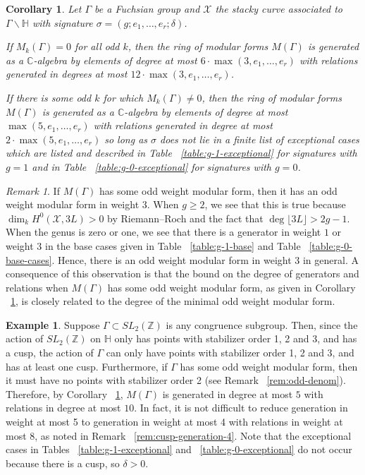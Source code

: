 \documentclass{amsart}
\theoremstyle{plain}
\newtheorem{cor}[thm]{Corollary}
\theoremstyle{definition}
\newtheorem{example}[thm]{Example}
\theoremstyle{remark}
\newtheorem{rem}[thm]{Remark}
\numberwithin{equation}{section}
\newcommand\BH{{\mathbb H}}
\newcommand\BC{{\mathbb C}}
\newcommand\BZ{{\mathbb Z}}
\newcommand\sx{\mathscr X}
\newcommand{\halfcan}{L}
\begin{document}
\begin{cor}
\label{cor:main-mod-forms}
Let $\Gamma$ be a Fuchsian group and $\sx$ the stacky curve
associated to $\Gamma \backslash \BH$ with signature $\sigma
= (g; e_1, \ldots, e_r; \delta)$. 

If $M_k(\Gamma) = 0$ for all odd $k$, then the ring of modular
forms $M(\Gamma)$ is generated as a $\BC$-algebra by elements of
degree at most $6 \cdot \max(3, e_1, \ldots, e_r)$ with relations
generated in degrees at most $12 \cdot \max(3, e_1, \ldots, e_r)$.

If there is some odd $k$ for which $M_k(\Gamma) \neq 0$, then the
ring of modular forms $M(\Gamma)$ is generated as a $\BC$-algebra
by elements of degree at most $\max(5, e_1, \ldots, e_r)$ with
relations generated in degree at most $2 \cdot \max(5, e_1, \ldots, 
e_r)$ so long as $\sigma$ does not lie in a finite list of
exceptional cases which are listed and described in Table
~\ref{table:g-1-exceptional} for signatures with $g = 1$ and in
Table ~\ref{table:g-0-exceptional} for signatures with $g = 0$.
\end{cor}

\begin{rem}
\label{rem:gen-at-most-three}
If $M(\Gamma)$ has some odd weight modular form, then it has an odd weight modular form in weight $3$. When $g \geq 2$, we see that this is true because $\dim_k H^0(\sx, 3\halfcan) > 0$ by Riemann--Roch and the fact that $\deg \lfloor 3\halfcan \rfloor > 2g - 1$. When the genus is zero or one, we see that there is a generator in weight $1$ or weight $3$ in the base cases given in Table ~\ref{table:g-1-base} and Table ~\ref{table:g-0-base-cases}. Hence, there is an odd weight modular form in weight $3$ in general. A consequence of this observation is that the bound on the degree of generators and relations when $M(\Gamma)$ has some odd weight modular form, as given in Corollary ~\ref{cor:main-mod-forms}, is closely related to the degree of the minimal odd weight modular form.
\end{rem}

\begin{example}
\label{eg:congruence-bounds}
Suppose $\Gamma \subset SL_2(\BZ)$ is any congruence subgroup. Then, since
the action  of $SL_2(\BZ)$ on $\BH$ only has points with stabilizer order 1, 2 and 3, and has a cusp, the 
action of $\Gamma$ can only have points with stabilizer order 1, 2 and 3, and has at least one cusp.
Furthermore, if $\Gamma$ has some odd weight modular form, then it must 
have no points with stabilizer order 2 (see Remark ~\ref{rem:odd-denom}). 
Therefore, by Corollary ~\ref{cor:main-mod-forms}, $M(\Gamma)$ is 
generated in degree at most $5$ with relations in degree at most $10$. In fact, it is not difficult to reduce generation in weight at most 5 to generation in weight at most 4 with relations in weight at most 8, as noted in Remark ~\ref{rem:cusp-generation-4}. Note that the exceptional cases in Tables ~\ref{table:g-1-exceptional} and ~\ref{table:g-0-exceptional} do not occur because there is a cusp, so $\delta > 0$.
\end{example}
\end{document}
